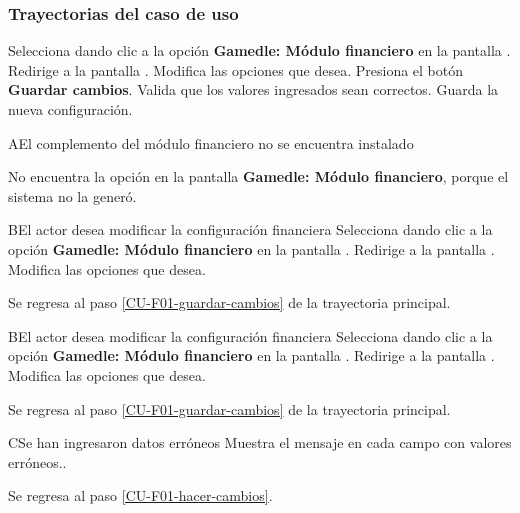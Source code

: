 \subsubsection{Trayectorias del caso de uso}

\begin{UCtrayectoria}%
%

    \Actor Selecciona dando clic a la opción \textbf{Gamedle: Módulo financiero} en la pantalla . 
    \Sistema Redirige a la pantalla .
    \Actor Modifica las opciones que desea. 
    \label{CU-F01-hacer-cambios}
    \Actor Presiona el botón \textbf{Guardar cambios}. 
    \label{CU-F01-guardar-cambios}
    \Sistema Valida que los valores ingresados sean correctos. 
    \Sistema Guarda la nueva configuración.

\end{UCtrayectoria}

\begin{UCtrayectoriaA}%
  {A}{El complemento del  módulo financiero no se encuentra instalado}

  \Actor No encuentra la opción en la pantalla  \textbf{Gamedle: Módulo financiero}, porque el sistema no la generó.

\end{UCtrayectoriaA}

\begin{UCtrayectoriaA}%
{B}{El actor desea modificar la configuración financiera}
    \Actor Selecciona dando clic a la opción \textbf{Gamedle: Módulo financiero} en la pantalla .
    \Sistema Redirige a la pantalla .
    \Actor Modifica las opciones que desea. 
    \item Se regresa al paso \ref{CU-F01-guardar-cambios} de la trayectoria principal.

\end{UCtrayectoriaA}

\begin{UCtrayectoriaA}%
{B}{El actor desea modificar la configuración financiera}
    \Actor Selecciona dando clic a la opción \textbf{Gamedle: Módulo financiero} en la pantalla .
    \Sistema Redirige a la pantalla .
    \Actor Modifica las opciones que desea. 
    \item Se regresa al paso \ref{CU-F01-guardar-cambios} de la trayectoria principal.

\end{UCtrayectoriaA}


\begin{UCtrayectoriaA}%
{C}{Se han ingresaron datos erróneos}
    \Sistema Muestra el mensaje  en cada campo con valores erróneos.. 
    \item Se regresa al paso \ref{CU-F01-hacer-cambios}.

\end{UCtrayectoriaA}
